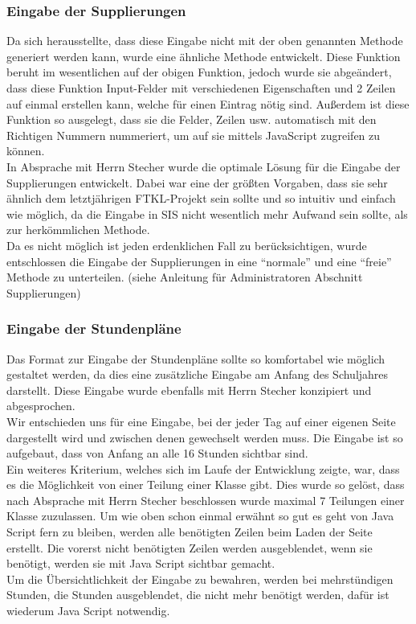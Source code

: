 \subsubsection{Eingabe der Supplierungen}
Da sich herausstellte, dass diese Eingabe nicht mit der oben genannten Methode generiert werden kann, wurde eine ähnliche Methode entwickelt. Diese Funktion beruht im wesentlichen auf der obigen Funktion, jedoch wurde sie abgeändert, dass diese Funktion Input-Felder mit verschiedenen Eigenschaften und 2 Zeilen auf einmal erstellen kann, welche für einen Eintrag nötig sind. Außerdem ist diese Funktion so ausgelegt, dass sie die Felder, Zeilen usw. automatisch mit den Richtigen Nummern nummeriert, um auf sie mittels JavaScript zugreifen zu können.\\
In Absprache mit Herrn Stecher wurde die optimale Lösung für die Eingabe der Supplierungen entwickelt. Dabei war eine der größten Vorgaben, dass sie sehr ähnlich dem letztjährigen FTKL-Projekt sein sollte und so intuitiv und einfach wie möglich, da die Eingabe in SIS nicht wesentlich mehr Aufwand sein sollte, als zur herkömmlichen Methode.\\
Da es nicht möglich ist jeden erdenklichen Fall zu berücksichtigen, wurde entschlossen die Eingabe der Supplierungen in eine \enquote{normale} und eine \enquote{freie} Methode zu unterteilen. (siehe Anleitung für Administratoren Abschnitt Supplierungen)
\subsubsection{Eingabe der Stundenpläne}
Das Format zur Eingabe der Stundenpläne sollte so komfortabel wie möglich gestaltet werden, da dies eine zusätzliche Eingabe am Anfang des Schuljahres darstellt. Diese Eingabe wurde ebenfalls mit Herrn Stecher konzipiert und abgesprochen.\\
Wir entschieden uns für eine Eingabe, bei der jeder Tag auf einer eigenen Seite dargestellt wird und zwischen denen gewechselt werden muss. Die Eingabe ist so aufgebaut, dass von Anfang an alle 16 Stunden sichtbar sind.\\ 
Ein weiteres Kriterium, welches sich im Laufe der Entwicklung zeigte, war, dass es die Möglichkeit von einer Teilung einer Klasse gibt. Dies wurde so gelöst, dass nach Absprache mit Herrn Stecher beschlossen wurde maximal 7 Teilungen einer Klasse zuzulassen. Um wie oben schon einmal erwähnt so gut es geht von Java Script fern zu bleiben, werden alle benötigten Zeilen beim Laden der Seite erstellt. Die vorerst nicht benötigten Zeilen werden ausgeblendet, wenn sie benötigt, werden sie mit Java Script sichtbar gemacht.\\
Um die Übersichtlichkeit der Eingabe zu bewahren, werden bei mehrstündigen Stunden, die Stunden ausgeblendet, die nicht mehr benötigt werden, dafür ist wiederum Java Script notwendig.
